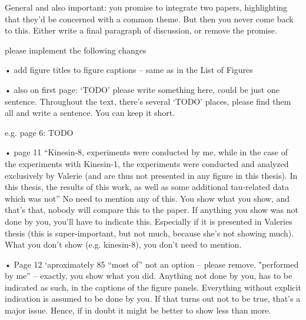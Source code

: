General and also important: you promise to integrate two papers, highlighting that they’d be concerned with a common theme. But then you never come back to this. Either write a final paragraph of discussion, or remove the promise. 


please implement the following changes


• add figure titles to figure captions – same as in the List of Figures



• also on first page: ‘TODO’ please write something here, could be just one sentence. Throughout the text, there’s several ‘TODO’ places, please find them all and write a sentence. You can keep it short. 

e.g. page 6: TODO

• page 11 “Kinesin-8, experiments were conducted by me, while in the case of the experiments with Kinesin-1, the experiments were conducted and analyzed exclusively by Valerie (and are thus not presented in any figure in this thesis). In this thesis, the results of this work, as well as some additional tau-related data which was not” 
	No need to mention any of this. You show what you show, and that’s that, nobody will compare this to the paper.  If anything you show was not done by you, you’ll have to indicate this. Especially if it is presented in Valeries thesis (this is super-important, but not much, because she’s not showing much). What you don’t show (e.g. kinesin-8), you don’t need to mention.


• Page 12 ‘aproximately 85%
	“most of” not an option – please remove. "performed by me” – exactly, you show what you did. Anything not done by you, has to be indicated as such, in the captions of the figure panels. Everything without explicit indication is assumed to be done by you. If that turns out not to be true, that’s a major issue. Hence, if in doubt it might be better to show less than more. 


